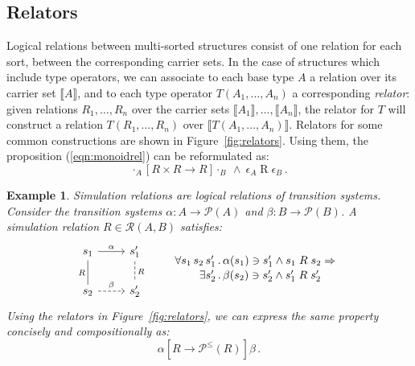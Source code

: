\documentclass[11pt,oneside]{book}
\newtheorem{example}[theorem]{Example}
\theoremstyle{definition}
\newcommand{\ifr}[1]{\mathrel{[{#1}]}}
\begin{document}
\subsection{Relators} \label{sec:relators} %

Logical relations between multi-sorted structures
consist of one relation for each sort,
between the corresponding carrier sets.
In the case of structures which include type operators,
we can associate to each base type $A$
a relation over its carrier set $\llbracket A \rrbracket$,
and to each type operator $T(A_1, \ldots, A_n)$
a corresponding \emph{relator}:
given relations $R_1, \ldots, R_n$ over
the carrier sets $\llbracket A_1 \rrbracket, \ldots, \llbracket A_n \rrbracket$,
the relator for $T$
will construct a relation $T(R_1, \ldots, R_n)$
over $\llbracket T(A_1, \ldots, A_n) \rrbracket$.
Relators for some common constructions are shown in Figure~\ref{fig:relators}.
Using them, the proposition (\ref{eqn:monoidrel}) can be reformulated as:
\[
  \cdot_A \ifr{R \times R \rightarrow R} \cdot_B
  \: \wedge \:
  \epsilon_A \mathrel{R} \epsilon_B \,.
\]

\begin{example} \label{ex:simrel} %
Simulation relations are
logical relations of transition systems.
Consider the transition systems
$\alpha : A \rightarrow \mathcal{P}(A)$ and
$\beta : B \rightarrow \mathcal{P}(B)$.
A simulation relation $R \in \mathcal{R}(A, B)$
satisfies:
\[
  \begin{tikzcd}[scale=0.8]
    s_1 \arrow[r, "\alpha"]
        \arrow[d, dash, "R"'] &
    s_1' \arrow[d, dashed, dash, "R"] \\
    s_2 \arrow[r, dashed, "\beta"] &
    s_2'
  \end{tikzcd}
  \qquad
  \label{eqn:simrel}
  \begin{array}{r@{\,.\,}l}
    \forall s_1 \, s_2 \, s_1' &
      \alpha(s_1) \ni s_1' \wedge s_1 \mathrel{R} s_2 \Rightarrow
    \\[0.25ex]
    \exists s_2' &
      \beta(s_2) \ni s_2' \wedge s_1' \mathrel{R} s_2'
  \end{array}
\]
Using the relators in Figure~\ref{fig:relators},
we can express the same property
concisely and compositionally as:
\[
  \alpha \ifr{R \rightarrow \mathcal{P}^\le(R)} \beta \,.
\]
\end{example}
\end{document}
